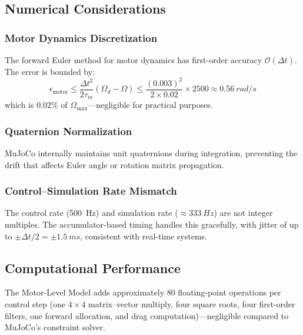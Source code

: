 \documentclass[journal]{IEEEtran}
\begin{document}
\subsection{Numerical Considerations}

\subsubsection{Motor Dynamics Discretization}

The forward Euler method for motor dynamics has first-order accuracy $\mathcal{O}(\Delta t)$. The error is bounded by:
\begin{equation}
  \epsilon_{\text{motor}} \leq \frac{\Delta t^2}{2\tau_m} (\Omega_{d} - \Omega) \leq \frac{(0.003)^2}{2 \times 0.02} \times 2500 \approx \SI{0.56}{rad/s}
  \label{eq:motor_error}
\end{equation}
which is $0.02\%$ of $\Omega_{\max}$---negligible for practical purposes.

\subsubsection{Quaternion Normalization}

MuJoCo internally maintains unit quaternions during integration, preventing the drift that affects Euler angle or rotation matrix propagation.

\subsubsection{Control--Simulation Rate Mismatch}

The control rate (\SI{500}{Hz}) and simulation rate (${\approx}\SI{333}{Hz}$) are not integer multiples. The accumulator-based timing handles this gracefully, with jitter of up to $\pm \Delta t/2 = \pm \SI{1.5}{ms}$, consistent with real-time systems.

\subsection{Computational Performance}

The Motor-Level Model adds approximately 80 floating-point operations per control step (one $4\!\times\!4$ matrix--vector multiply, four square roots, four first-order filters, one forward allocation, and drag computation)---negligible compared to MuJoCo's constraint solver.


\end{document}

